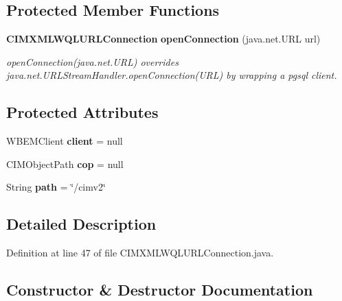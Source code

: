 \subsection*{Protected Member Functions}
\begin{DoxyCompactItemize}
\item 
{\bf C\+I\+M\+X\+M\+L\+W\+Q\+L\+U\+R\+L\+Connection} {\bf open\+Connection} (java.\+net.\+U\+R\+L url)
\begin{DoxyCompactList}\small\item\em open\+Connection(java.\+net.\+U\+R\+L) overrides java.\+net.\+U\+R\+L\+Stream\+Handler.\+open\+Connection(\+U\+R\+L) by wrapping a pgsql client. \end{DoxyCompactList}\end{DoxyCompactItemize}
\subsection*{Protected Attributes}
\begin{DoxyCompactItemize}
\item 
W\+B\+E\+M\+Client {\bf client} = null
\item 
C\+I\+M\+Object\+Path {\bf cop} = null
\item 
String {\bf path} = \char`\"{}/cimv2\char`\"{}
\end{DoxyCompactItemize}


\subsection{Detailed Description}


Definition at line 47 of file C\+I\+M\+X\+M\+L\+W\+Q\+L\+U\+R\+L\+Connection.\+java.



\subsection{Constructor \& Destructor Documentation}
